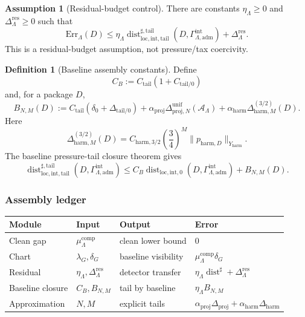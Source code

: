 \documentclass[11pt]{article}
\numberwithin{equation}{section}
\theoremstyle{definition}
\newtheorem{definition}[definition]{Definition}
\newtheorem{assumption}[assumption]{Assumption}
\theoremstyle{remark}
\newcommand{\loc}{\mathrm{loc}}
\newcommand{\intg}{\mathrm{int}}
\newcommand{\tail}{\mathrm{tail}}
\newcommand{\adm}{\mathrm{adm}}
\newcommand{\proj}{\mathrm{proj}}
\newcommand{\harm}{\mathrm{harm}}
\newcommand{\Dist}{\operatorname{dist}}
\newcommand{\Gammaadm}{\Gamma^{\intg}_{\Lambda,\adm}}
\begin{document}
\begin{assumption}[Residual-budget control]
\label{ass:residual-budget-control}
There are constants \(\eta_\Lambda\ge0\) and
\(\Delta_\Lambda^{\mathrm{res}}\ge0\) such that
\[
    \mathrm{Err}_\Lambda(D)
    \le
    \eta_\Lambda
    \Dist^{\sharp,\tail}_{\loc,\intg,\tail}(D,\Gammaadm)
    +
    \Delta_\Lambda^{\mathrm{res}}.
\]
This is a residual-budget assumption, not pressure/tax coercivity.
\end{assumption}

\begin{definition}[Baseline assembly constants]
\label{def:baseline-assembly-constants}
Define
\[
    C_B:=C_{\tail}(1+C_{\tail/0})
\]
and, for a package \(D\),
\[
    B_{N,M}(D)
    :=
    C_{\tail}(\delta_0+\Delta_{\tail/0})
    +
    \alpha_{\proj}
    \Delta^{\mathrm{unif}}_{\proj,N}(\mathcal A_\Lambda)
    +
    \alpha_{\harm}\Delta_{\harm,M}^{(3/2)}(D).
\]
Here
\[
    \Delta_{\harm,M}^{(3/2)}(D)
    =
    C_{\harm,3/2}
    \left(\frac34\right)^M
    \|p_{\harm,D}\|_{Y_{\harm}}.
\]
The baseline pressure-tail closure theorem gives
\[
    \Dist^{\sharp,\tail}_{\loc,\intg,\tail}(D,\Gammaadm)
    \le
    C_B
    \Dist_{\loc,\intg,0}(D,\Gammaadm)
    +
    B_{N,M}(D).
\]
\end{definition}

\subsubsection{Assembly ledger}

\begin{center}
\scriptsize
\begin{tabular}{@{}llll@{}}
\hline
Module & Input & Output & Error \\
\hline
Clean gap & \(\mu^{\mathrm{comp}}_\Lambda\) & clean lower bound & \(0\)\\
Chart & \(\lambda_G,\delta_G\) & baseline visibility & \(\mu^{\mathrm{comp}}_\Lambda\delta_G\)\\
Residual & \(\eta_\Lambda,\Delta_\Lambda^{\mathrm{res}}\) & detector transfer & \(\eta_\Lambda\Dist^\sharp+\Delta_\Lambda^{\mathrm{res}}\)\\
Baseline closure & \(C_B,B_{N,M}\) & tail by baseline & \(\eta_\Lambda B_{N,M}\)\\
Approximation & \(N,M\) & explicit tails & \(\alpha_{\proj}\Delta_{\mathrm{proj}}+\alpha_{\harm}\Delta_{\harm}\)\\
\hline
\end{tabular}
\end{center}
\end{document}

